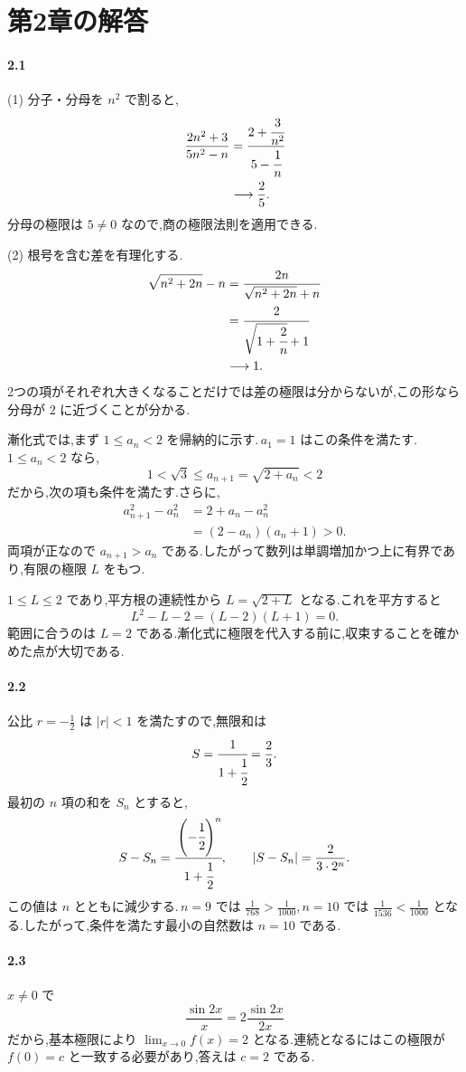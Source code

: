 \section{第2章の解答}\label{解答:第2章}
\paragraph{2.1}
(1) 分子・分母を $n^2$ で割ると,
\begin{align*}
 \frac{2n^2+3}{5n^2-n}
 &=\cfrac{2+\cfrac3{n^2}}{5-\cfrac1n}\\
 &\longrightarrow\frac25.
\end{align*}
分母の極限は $5\ne0$ なので,商の極限法則を適用できる.

(2) 根号を含む差を有理化する.
\begin{align*}
 \sqrt{n^2+2n}-n
 &=\frac{2n}{\sqrt{n^2+2n}+n}\\
 &=\cfrac2{\sqrt{1+\cfrac2n}+1}\\
 &\longrightarrow1.
\end{align*}
2つの項がそれぞれ大きくなることだけでは差の極限は分からないが,この形なら分母が $2$ に近づくことが分かる.

漸化式では,まず $1\le a_n<2$ を帰納的に示す.\,$a_1=1$ はこの条件を満たす.\,$1\le a_n<2$ なら,
\[
 1<\sqrt3\le a_{n+1}=\sqrt{2+a_n}<2
\]
だから,次の項も条件を満たす.さらに,
\begin{align*}
 a_{n+1}^2-a_n^2
 &=2+a_n-a_n^2\\
 &=(2-a_n)(a_n+1)>0.
\end{align*}
両項が正なので $a_{n+1}>a_n$ である.したがって数列は単調増加かつ上に有界であり,有限の極限 $L$ をもつ.

$1\le L\le2$ であり,平方根の連続性から $L=\sqrt{2+L}$ となる.これを平方すると
\[
 L^2-L-2=(L-2)(L+1)=0.
\]
範囲に合うのは $L=2$ である.漸化式に極限を代入する前に,収束することを確かめた点が大切である.

\paragraph{2.2}
公比 $r=-\frac12$ は $|r|<1$ を満たすので,無限和は
\[
 S=\cfrac1{1+\cfrac12}=\frac23.
\]
最初の $n$ 項の和を $S_n$ とすると,
\[
 S-S_n=\cfrac{\left(-\cfrac12\right)^n}{1+\cfrac12},\qquad
 |S-S_n|=\frac{2}{3\cdot2^n}.
\]
この値は $n$ とともに減少する.\,$n=9$ では $\frac1{768}>\frac1{1000}$,\,$n=10$ では $\frac1{1536}<\frac1{1000}$ となる.したがって,条件を満たす最小の自然数は $n=10$ である.

\paragraph{2.3}
$x\ne0$ で
\[
 \frac{\sin2x}{x}=2\frac{\sin2x}{2x}
\]
だから,基本極限により $\lim_{x\to0}f(x)=2$ となる.連続となるにはこの極限が $f(0)=c$ と一致する必要があり,答えは $c=2$ である.

